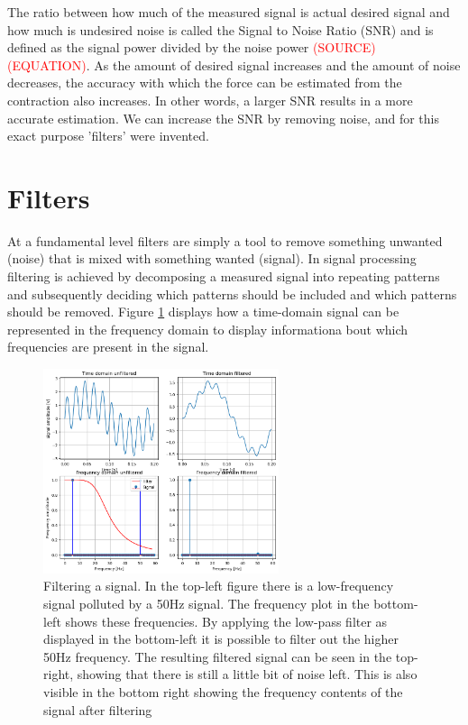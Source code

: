 The ratio between how much of the measured signal is actual desired signal and how much is undesired noise is called the Signal to Noise Ratio (SNR) and is defined as the signal power divided by the noise power \textcolor{red}{(SOURCE) (EQUATION)}. As the amount of desired signal increases and the amount of noise decreases, the accuracy with which the force can be estimated from the contraction also increases. In other words, a larger SNR results in a more accurate estimation. We can increase the SNR by removing noise, and for this exact purpose 'filters' were invented.

\section{Filters}
At a fundamental level filters are simply a tool to remove something unwanted (noise) that is mixed with something wanted (signal). In signal processing filtering is achieved by decomposing a measured signal into repeating patterns and subsequently deciding which patterns should be included and which patterns should be removed. Figure \ref{fig:filter_example} displays how a time-domain signal can be represented in the frequency domain to display informationa bout which frequencies are present in the signal.

\begin{figure}[h!t]
	\begin{center}
		\includegraphics[height=60mm]{images/filter_example.png}
	\end{center}
	\caption{Filtering a signal. In the top-left figure there is a low-frequency signal polluted by a 50Hz signal. The frequency plot in the bottom-left shows these frequencies. By applying the low-pass filter as displayed in the bottom-left it is possible to filter out the higher 50Hz frequency. The resulting filtered signal can be seen in the top-right, showing that there is still a little bit of noise left. This is also visible in the bottom right showing the frequency contents of the signal after filtering}
	\label{fig:filter_example}
\end{figure}

